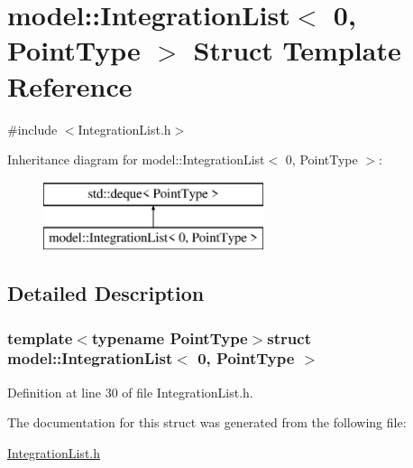 \hypertarget{structmodel_1_1_integration_list_3_010_00_01_point_type_01_4}{}\section{model\+:\+:Integration\+List$<$ 0, Point\+Type $>$ Struct Template Reference}
\label{structmodel_1_1_integration_list_3_010_00_01_point_type_01_4}


{\ttfamily \#include $<$Integration\+List.\+h$>$}

Inheritance diagram for model\+:\+:Integration\+List$<$ 0, Point\+Type $>$\+:\begin{figure}[H]
\begin{center}
\leavevmode
\includegraphics[height=2.000000cm]{structmodel_1_1_integration_list_3_010_00_01_point_type_01_4}
\end{center}
\end{figure}


\subsection{Detailed Description}
\subsubsection*{template$<$typename Point\+Type$>$struct model\+::\+Integration\+List$<$ 0, Point\+Type $>$}



Definition at line 30 of file Integration\+List.\+h.



The documentation for this struct was generated from the following file\+:\begin{DoxyCompactItemize}
\item 
\hyperlink{_integration_list_8h}{Integration\+List.\+h}\end{DoxyCompactItemize}
